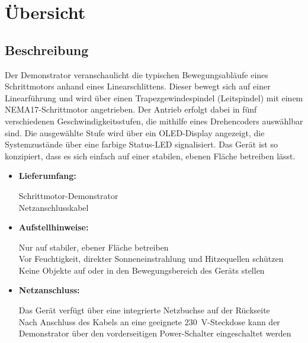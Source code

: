 \documentclass[a4paper,12pt]{report}
\begin{document}
	\chapter{Übersicht}
	\section{Beschreibung}
	
	Der Demonstrator veranschaulicht die typischen Bewegungsabläufe eines Schrittmotors anhand eines Linearschlittens. Dieser bewegt sich auf einer Linearführung und wird über einen Trapezgewindespindel (Leitspindel) mit einem NEMA17-Schrittmotor angetrieben. Der Antrieb erfolgt dabei in fünf verschiedenen Geschwindigkeitsstufen, die mithilfe eines Drehencoders auswählbar sind. Die ausgewählte Stufe wird über ein OLED-Display angezeigt, die Systemzustände über eine farbige Status-LED signalisiert. Das Gerät ist so konzipiert, dass es sich einfach auf einer stabilen, ebenen Fläche betreiben lässt.\\ 
	
	\begin{itemize}[leftmargin=1.5em]
		 
		
		\item\textbf{Lieferumfang:} 
		
		Schrittmotor-Demonstrator\\
		
		Netzanschlusskabel\\
		
		\item\textbf{Aufstellhinweise:} 
		
		Nur auf stabiler, ebener Fläche betreiben\\
		Vor Feuchtigkeit, direkter Sonneneinstrahlung und Hitzequellen schützen\\
		
		Keine Objekte auf oder in den Bewegungsbereich des Geräts stellen\\
		
		\item\textbf{Netzanschluss:}  
		
		Das Gerät verfügt über eine integrierte Netzbuchse auf der Rückseite\\
		
		Nach Anschluss des Kabels an eine geeignete 230\ V-Steckdose kann der Demonstrator über den vorderseitigen Power-Schalter eingeschaltet werden\\
		
	\end{itemize}
	\newpage
	
\end{document}
